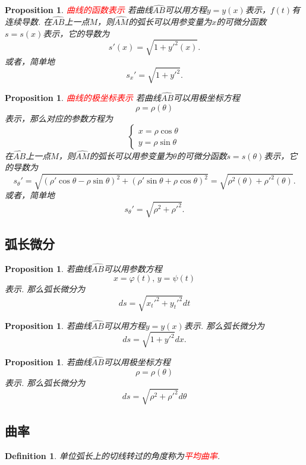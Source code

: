 \documentclass{article}
\newtheorem{proposition}[theorem]{Proposition}
\newtheorem{definition}[theorem]{Definition}
\newcommand{\redt}[1]{\textcolor{red}{#1}}
\begin{document}
\begin{proposition}
\rm \redt{曲线的函数表示} 若曲线$\widehat{AB}$可以用方程$y=y(x)$表示，$f(t)$有连续导数. 在$\widehat{AB}$上一点$M$，则$\widehat{AM}$的弧长可以用参变量为$x$的可微分函数$s = s(x)$表示，它的导数为
$$
s'(x) = \sqrt{1+y'^2(x)}. 
$$
或者，简单地
$$
s_x' = \sqrt{1+y'^2}.
$$
\end{proposition}

\begin{proposition}
\rm \redt{曲线的极坐标表示} 若曲线$\widehat{AB}$可以用极坐标方程
$$
\rho = \rho(\theta)
$$
表示，那么对应的参数方程为
$$
\left \{
\begin{array}{ll}
x = \rho\cos\theta \\
y = \rho\sin\theta
\end{array} \right.
$$
在$\widehat{AB}$上一点$M$，则$\widehat{AM}$的弧长可以用参变量为$\theta$的可微分函数$s = s(\theta)$表示，它的导数为
$$
s_\theta' = \sqrt{(\rho'\cos\theta-\rho\sin\theta)^2 +(\rho'\sin\theta+\rho\cos\theta)^2} = \sqrt{\rho^2(\theta) + \rho'^2(\theta)}.
$$
或者，简单地
$$
s_\theta' = \sqrt{\rho^2 + \rho'^2}. 
$$
\end{proposition}

\subsection{弧长微分}

\begin{proposition}
\rm 若曲线$\widehat{AB}$可以用参数方程
$$
x = \varphi(t), \, y = \psi(t) 
$$
表示. 那么弧长微分为
$$
ds = \sqrt{x_t'^2 + y_t'^2}dt
$$
\end{proposition}

\begin{proposition}
\rm  若曲线$\widehat{AB}$可以用方程$y=y(x)$表示. 那么弧长微分为
$$
ds = \sqrt{1+y'^2} dx. 
$$
\end{proposition}

\begin{proposition}
\rm 若曲线$\widehat{AB}$可以用极坐标方程
$$
\rho = \rho(\theta)
$$
表示. 那么弧长微分为
$$
ds = \sqrt{\rho^2+\rho'^2}d\theta
$$
\end{proposition}

\subsection{曲率}

\begin{definition}
\rm 单位弧长上的切线转过的角度称为\redt{平均曲率}. 
\end{definition}
\end{document}
